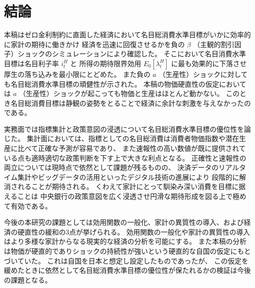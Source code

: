 
\chapter{結論}
\label{chap:chapter7}
本稿はゼロ金利制約に直面した経済において名目総消費水準目標がいかに効率的に家計の期待に働きかけ
経済を迅速に回復させるかを負の \( \beta \) （主観的割引因子）ショックのシミュレーションにより確認した。
そこにおいて名目消費水準目標は名目利子率 \( i_t^H \) と
所得の期待限界効用 \( E_0[\lambda_t^H] \) に最も効果的に下落させ厚生の落ち込みを最小限にとどめた。
また負の \( a \) （生産性）ショックに対しても名目総消費水準目標の頑健性が示された。
本稿の物価硬直性の仮定においては \( a \) （生産性）ショックが起こっても物価と生産はほとんど動かない。
このとき名目総消費目標は静観の姿勢をとることで経済に余計な刺激を与えなかったのである。


実務面では指標集計と政策意図の浸透について名目総消費水準目標の優位性を論じた。
集計面においては、指標としての名目総消費は消費者物価指数や潜在生産に比べて正確な予測が容易であり、
また速報性の高い数値が既に提供されている点も適時適切な政策判断を下す上で大きな利点となる。
正確性と速報性の両立については現時点で依然として課題が残るものの、
決済データのリアルタイム集計やビッグデータの活用といったデジタル技術の進展により
段階的に解消されることが期待される。
くわえて家計にとって馴染み深い消費を目標に据えることは
中央銀行の政策意図を広く浸透させ円滑な期待形成を図る上で極めて有効である。


今後の本研究の課題としては効用関数の一般化、家計の異質性の導入、および経済の硬直性の緩和の3点が挙げられる。
効用関数の一般化や家計の異質性の導入はより多様な家計からなる現実的な経済の分析を可能にする。
また本稿の分析は物価が硬直的でありショックの持続性が強いという硬直的な自国の仮定にもとづいていた。
これは自国を日本と想定し設定したものであったが、
この仮定を緩めたときに依然として名目総消費水準目標の優位性が保たれるかの検証は今後の課題となる。